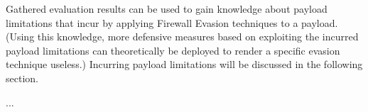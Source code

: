 Gathered evaluation results can be used to gain knowledge about payload limitations that incur by applying Firewall Evasion techniques to a payload. (Using this knowledge, more defensive measures based on exploiting the incurred payload limitations can theoretically be deployed to render a specific evasion technique useless.)
Incurring payload limitations will be discussed in the following section.



... 
